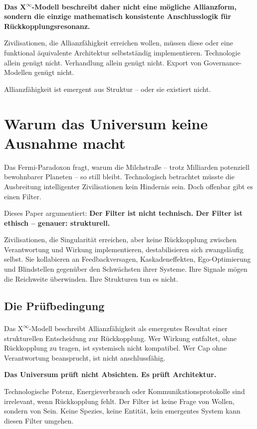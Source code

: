 \documentclass[12pt,a4paper]{article}
\begin{document}
\textbf{Das \texorpdfstring{X\textsuperscript{\(\infty\)}}{X-Infinity}-Modell beschreibt daher nicht eine mögliche Allianzform, sondern die einzige mathematisch konsistente Anschlusslogik für Rückkopplungsresonanz.}

Zivilisationen, die Allianzfähigkeit erreichen wollen, müssen diese oder eine funktional äquivalente Architektur selbstständig implementieren.  
Technologie allein genügt nicht.  
Verhandlung allein genügt nicht.  
Export von Governance-Modellen genügt nicht.  

Allianzfähigkeit ist emergent aus Struktur – oder sie existiert nicht.

\section{Warum das Universum keine Ausnahme macht}

Das Fermi-Paradoxon fragt, warum die Milchstraße – trotz Milliarden potenziell bewohnbarer Planeten – so still bleibt.  
Technologisch betrachtet müsste die Ausbreitung intelligenter Zivilisationen kein Hindernis sein. Doch offenbar gibt es einen Filter.

Dieses Paper argumentiert:  
\textbf{Der Filter ist nicht technisch. Der Filter ist ethisch – genauer: strukturell.}

Zivilisationen, die Singularität erreichen, aber keine Rückkopplung zwischen Verantwortung und Wirkung implementieren, destabilisieren sich zwangsläufig selbst.  
Sie kollabieren an Feedbackversagen, Kaskadeneffekten, Ego-Optimierung und Blindstellen gegenüber den Schwächsten ihrer Systeme.  
Ihre Signale mögen die Reichweite überwinden. Ihre Strukturen tun es nicht.

\subsection{Die Prüfbedingung}

Das \texorpdfstring{X\textsuperscript{\(\infty\)}}{X-Infinity}-Modell beschreibt Allianzfähigkeit als emergentes Resultat einer strukturellen Entscheidung zur Rückkopplung.  
Wer Wirkung entfaltet, ohne Rückkopplung zu tragen, ist systemisch nicht kompatibel.  
Wer Cap ohne Verantwortung beansprucht, ist nicht anschlussfähig.

\textbf{Das Universum prüft nicht Absichten. Es prüft Architektur.}

Technologische Potenz, Energieverbrauch oder Kommunikationsprotokolle sind irrelevant, wenn Rückkopplung fehlt.  
Der Filter ist keine Frage von Wollen, sondern von Sein.  
Keine Spezies, keine Entität, kein emergentes System kann diesen Filter umgehen.
\end{document}

